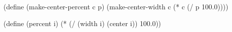 \begtt\scm
(define (make-center-percent c p)
  (make-center-width c (* c (/ p 100.0))))

(define (percent i)
  (* (/ (width i) (center i)) 100.0))
\endtt
